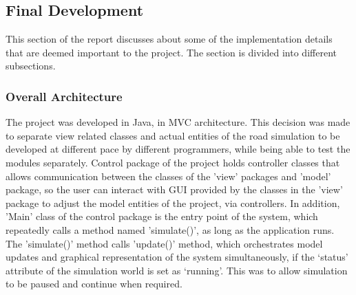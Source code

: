 \documentclass[11pt]{article}
\begin{document}
\subsection{Final Development}
This section of the report discusses about some of the implementation details that are deemed important to the project. The section is divided into different subsections.
\subsubsection{Overall Architecture}
The project was developed in Java, in MVC architecture. This decision was made to separate view related classes and actual entities of the road simulation to be developed at different pace by different programmers, while being able to test the modules separately. Control package of the project holds controller classes that allows communication between the classes of the 'view' packages and 'model' package, so the user can interact with GUI provided by the classes in the 'view' package to adjust the model entities of the project, via controllers. In addition, 'Main' class of the control package is the entry point of the system, which repeatedly calls a method named 'simulate()', as long as the application runs. The 'simulate()' method calls 'update()' method, which orchestrates model updates and graphical representation of the system simultaneously, if the ‘status’ attribute of the simulation world is set as ‘running’. This was to allow simulation to be paused and continue when required.
\end{document}
